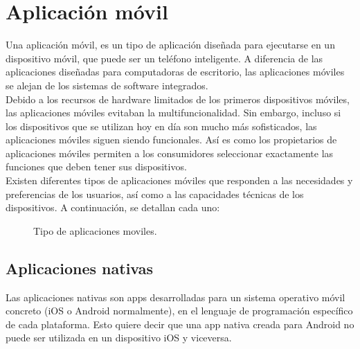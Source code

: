 
\section{Aplicación móvil}
Una aplicación móvil, es un tipo de aplicación diseñada para ejecutarse en un dispositivo móvil, que puede ser un teléfono inteligente. A  diferencia de las aplicaciones diseñadas para computadoras de escritorio, las aplicaciones móviles se alejan de los sistemas de software integrados. \\

Debido a los recursos de hardware limitados de los primeros dispositivos móviles, las aplicaciones móviles evitaban la multifuncionalidad. Sin embargo, incluso si los dispositivos que se utilizan hoy en día son mucho más sofisticados, las aplicaciones móviles siguen siendo funcionales. Así es como los propietarios de aplicaciones móviles permiten a los consumidores seleccionar exactamente las funciones que deben tener sus dispositivos. \\

Existen diferentes tipos de aplicaciones móviles que responden a las necesidades y preferencias de los usuarios, así como a las capacidades técnicas de los dispositivos. A continuación, se detallan cada uno:

\begin{figure}[htbp]
	\begin{center}
		\caption{Tipo de aplicaciones moviles.}
		\label{fig:casosDeUso}
	\end{center}
\end{figure}

\subsection{Aplicaciones nativas}
Las aplicaciones nativas son apps desarrolladas para un sistema operativo móvil concreto (iOS o Android normalmente), en el lenguaje de programación específico de cada plataforma. Esto quiere decir que una app nativa creada para Android no puede ser utilizada en un dispositivo iOS y viceversa. \\

